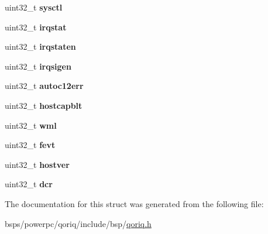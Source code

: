 \begin{DoxyCompactItemize}
\item 
\mbox{\label{structqoriq__esdhc_a203e15ba434c0faa3529e0ee3846067f}} 
uint32\+\_\+t {\bfseries sysctl}
\item 
\mbox{\label{structqoriq__esdhc_a9af2abdffff095e8431cb918c0ab7ba4}} 
uint32\+\_\+t {\bfseries irqstat}
\item 
\mbox{\label{structqoriq__esdhc_a69b3b07c81a4017aae66626802034bff}} 
uint32\+\_\+t {\bfseries irqstaten}
\item 
\mbox{\label{structqoriq__esdhc_a450a0b52e3f752741913b3847f034b49}} 
uint32\+\_\+t {\bfseries irqsigen}
\item 
\mbox{\label{structqoriq__esdhc_acbaea4af7de5a16f911b482ba1515701}} 
uint32\+\_\+t {\bfseries autoc12err}
\item 
\mbox{\label{structqoriq__esdhc_aa3a6379613c17bc17adf0a7b2cec5981}} 
uint32\+\_\+t {\bfseries hostcapblt}
\item 
\mbox{\label{structqoriq__esdhc_a9209f95320b16cd289b732d21160b4a2}} 
uint32\+\_\+t {\bfseries wml}
\item 
\mbox{\label{structqoriq__esdhc_aa4cef664f86623fb1c02735ba25eb457}} 
uint32\+\_\+t {\bfseries fevt}
\item 
\mbox{\label{structqoriq__esdhc_a82fd226739a50ee0b43fb87ff6d0d139}} 
uint32\+\_\+t {\bfseries hostver}
\item 
\mbox{\label{structqoriq__esdhc_a95d52fcf8000af3ed5fef4daf0a24d53}} 
uint32\+\_\+t {\bfseries dcr}
\end{DoxyCompactItemize}


The documentation for this struct was generated from the following file\+:\begin{DoxyCompactItemize}
\item 
bsps/powerpc/qoriq/include/bsp/\mbox{\hyperlink{qoriq_8h}{qoriq.\+h}}\end{DoxyCompactItemize}
